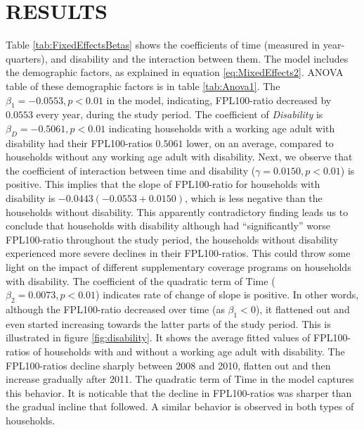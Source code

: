 \documentclass[11pt]{extarticle} %
\begin{document}
\section*{RESULTS}
Table \ref{tab:FixedEffectsBetas} shows the coefficients of time (measured in year-quarters), and disability and the interaction between them. The model includes the demographic factors, as explained in equation \ref{eq:MixedEffects2}. ANOVA table of these demographic factors is in table \ref{tab:Anova1}. The $\beta_1 = -0.0553, p < 0.01$ in the model, indicating, FPL100-ratio decreased by $0.0553$ every year, during the study period. The coefficient of {\emph{Disability}} is $\beta_D = -0.5061, p < 0.01$  indicating households with a working age adult with disability had their FPL100-ratios $0.5061$ lower, on an average, compared to households without any working age adult with disability. Next, we observe that the coefficient of interaction between time and disability ($\gamma = 0.0150, p < 0.01$) is positive. This implies that the slope of FPL100-ratio for households with disability is $-0.0443 (-0.0553 + 0.0150)$, which is less negative than the households without disability. This apparently contradictory finding leads us to conclude that households with disability although had ``significantly'' worse FPL100-ratio throughout the study period, the households without disability experienced more severe declines in their FPL100-ratios. This could throw some light on the impact of different supplementary coverage programs on households with disability. The coefficient of the quadratic term of Time ($\beta_2 = 0.0073, p < 0.01$) indicates rate of change of slope is positive. In other words, although the FPL100-ratio decreased over time (as $\beta_1 < 0$), it flattened out and even started increasing towards the latter parts of the study period. This is illustrated in figure \ref{fig:disability}. It shows the average fitted values of FPL100-ratios of households with and without a working age adult with disability. The FPL100-ratios decline sharply between 2008 and 2010, flatten out and then increase gradually after 2011. The quadratic term of Time in the model captures this behavior. It is noticable that the decline in FPL100-ratios was sharper than the gradual incline that followed. A similar behavior is observed in both types of households. 
\end{document}
